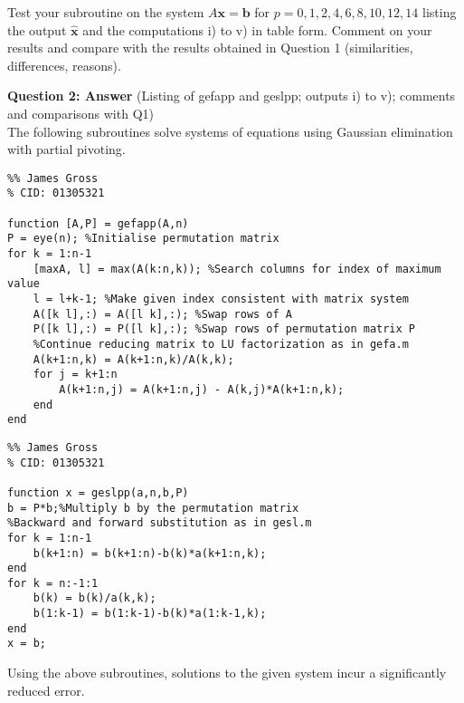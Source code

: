 \documentclass[12pt]{article}
\def\MM#1{\boldsymbol{#1}}
\begin{document}
Test your subroutine on the system $A\MM{x}=\MM{b}$  for $p = 0, 1, 2, 4, 6, 8, 10, 12, 14$  listing the output $\hat{\MM{x}}$ and the computations i) to v) in table form. Comment on your results and compare with the results obtained in Question 1 (similarities, differences, reasons).

\textbf{Question 2: Answer} (Listing of gefapp and geslpp; outputs i) to v); comments and comparisons with Q1)
\\
The following subroutines solve systems of equations using Gaussian elimination with partial pivoting.
\begin{lstlisting}
%% James Gross 
% CID: 01305321

function [A,P] = gefapp(A,n)
P = eye(n); %Initialise permutation matrix
for k = 1:n-1
    [maxA, l] = max(A(k:n,k)); %Search columns for index of maximum value
    l = l+k-1; %Make given index consistent with matrix system
    A([k l],:) = A([l k],:); %Swap rows of A
    P([k l],:) = P([l k],:); %Swap rows of permutation matrix P
    %Continue reducing matrix to LU factorization as in gefa.m
    A(k+1:n,k) = A(k+1:n,k)/A(k,k);
    for j = k+1:n
        A(k+1:n,j) = A(k+1:n,j) - A(k,j)*A(k+1:n,k);
    end
end
\end{lstlisting}
\begin{lstlisting}
%% James Gross
% CID: 01305321

function x = geslpp(a,n,b,P)
b = P*b;%Multiply b by the permutation matrix
%Backward and forward substitution as in gesl.m
for k = 1:n-1
    b(k+1:n) = b(k+1:n)-b(k)*a(k+1:n,k);
end
for k = n:-1:1
    b(k) = b(k)/a(k,k);
    b(1:k-1) = b(1:k-1)-b(k)*a(1:k-1,k);
end
x = b;
\end{lstlisting}

Using the above subroutines, solutions to the given system incur a significantly reduced error.
\end{document}
